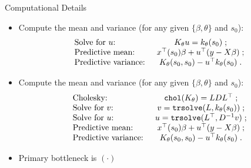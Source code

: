\begin{frame}{Computational Details}
 
 \begin{itemize}\setlength{\itemsep}{0.4cm}
  \item Compute the mean and variance (for any given $\{\beta, \theta\}$ and $s_0$):
  \begin{align*}
  \begin{array}{lc}
  \mbox{Solve for $u$: } & K_{\theta}u = k_{\theta}(s_0)\;; \\
  \mbox{Predictive mean: } & x^{\top}(s_0)\beta + u^{\top}(y - X\beta)\;; \\
  \mbox{Predictive variance: } & K_{\theta}(s_0,s_0) - u^{\top}k_{\theta}(s_0)\;.
  \end{array}
  \end{align*}
  
  \item Compute the mean and variance (for any given $\{\beta, \theta\}$ and $s_0$):
  \begin{align*}
  \begin{array}{lc}
  \mbox{Cholesky: } & \texttt{chol}(K_{\theta}) = LDL^{\top}\;; \\
  \mbox{Solve for $v$: } & v = \texttt{trsolve}(L, k_{\theta}(s_0))\;;\\ 
  \mbox{Solve for $u$: } & u = \texttt{trsolve}(L^{\top}, D^{-1}v)\;;\\ 
  \mbox{Predictive mean: } & x^{\top}(s_0)\beta + u^{\top}(y - X\beta)\;; \\
  \mbox{Predictive variance: } & K_{\theta}(s_0,s_0) - u^{\top}k_{\theta}(s_0)\;.
  \end{array}
  \end{align*}
  
  \item Primary bottleneck is $(\cdot)$
 \end{itemize}
 
\end{frame}


